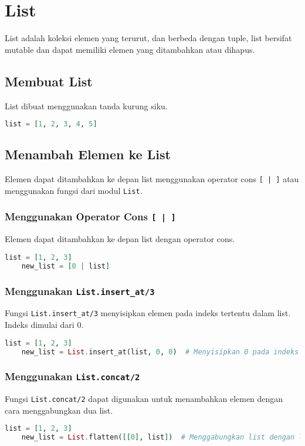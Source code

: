 \section{List}
List adalah koleksi elemen yang terurut, dan berbeda dengan tuple, list bersifat mutable dan dapat memiliki elemen yang ditambahkan atau dihapus.

\subsection{Membuat List}
List dibuat menggunakan tanda kurung siku.
\begin{lstlisting}[language=Elixir]
	list = [1, 2, 3, 4, 5]
\end{lstlisting}


\subsection{Menambah Elemen ke List}
Elemen dapat ditambahkan ke depan list menggunakan operator cons \texttt{[ | ]} atau menggunakan fungsi dari modul \texttt{List}.

\subsubsection{Menggunakan Operator Cons \texttt{[ | ]}}
Elemen dapat ditambahkan ke depan list dengan operator cons.
\begin{lstlisting}[language=Elixir]
	list = [1, 2, 3]
	new_list = [0 | list]
\end{lstlisting}

\subsubsection{Menggunakan \texttt{List.insert\_at/3}}
Fungsi \texttt{List.insert\_at/3} menyisipkan elemen pada indeks tertentu dalam list. Indeks dimulai dari 0.
\begin{lstlisting}[language=Elixir]
	list = [1, 2, 3]
	new_list = List.insert_at(list, 0, 0)  # Menyisipkan 0 pada indeks 0
\end{lstlisting}

\subsubsection{Menggunakan \texttt{List.concat/2}}
Fungsi \texttt{List.concat/2} dapat digunakan untuk menambahkan elemen dengan cara menggabungkan dua list.
\begin{lstlisting}[language=Elixir]
	list = [1, 2, 3]
	new_list = List.flatten([[0], list])  # Menggabungkan list dengan list baru yang berisi 0
\end{lstlisting}


